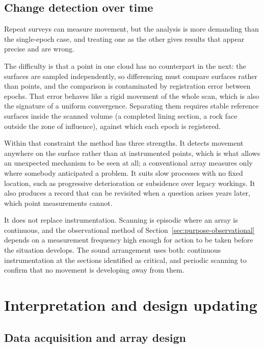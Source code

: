\subsection{Change detection over time}
\label{sec:change-detection}

Repeat surveys can measure movement, but the analysis is more demanding than
the single-epoch case, and treating one as the other gives results that
appear precise and are wrong.

The difficulty is that a point in one cloud has no counterpart in the next:
the surfaces are sampled independently, so differencing must compare surfaces
rather than points, and the comparison is contaminated by registration error
between epochs. That error behaves like a rigid movement of the whole scan,
which is also the signature of a uniform convergence. Separating them requires stable reference surfaces inside the
scanned volume (a completed lining section, a rock face outside the zone of
influence), against which each epoch is registered.

Within that constraint the method has three strengths. It detects movement anywhere on
the surface rather than at instrumented points, which is what allows an
unexpected mechanism to be seen at all; a conventional array measures only
where somebody anticipated a problem. It suits slow processes with no fixed
location, such as progressive deterioration or subsidence over legacy
workings. It also produces a record that can be revisited when a question
arises years later, which point measurements cannot.

It does not replace instrumentation. Scanning is episodic where an array is
continuous, and the observational method of
Section~\ref{sec:purpose-observational} depends on a measurement
frequency high enough for action to be taken before the situation develops.
The sound arrangement
uses both: continuous instrumentation at the sections identified as critical,
and periodic scanning to confirm that no movement is developing away from them.

\section{Interpretation and design updating}
\label{sec:interpretation-updating}

\subsection{Data acquisition and array design}
\label{sec:acquisition-array}

